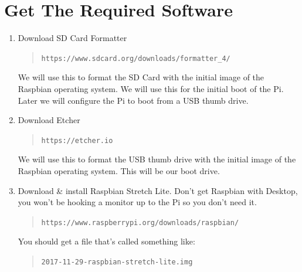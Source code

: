 \documentclass[11pt,oneside]{article}
\newcommand{\myurl}[1]{\begin{quote} \texttt{#1} \end{quote}}
\newcommand{\xtermPartialOutput}[1]{\begin{verse} \texttt{#1} \end{verse}}
\begin{document}
\section{Get The Required Software} \label{sect:getRequiredSoftware}
\begin{enumerate}
	\item Download SD Card Formatter
	\myurl{https://www.sdcard.org/downloads/formatter\_4/}
	We will use this to format the SD Card with the initial image of the Raspbian operating system.  We will use this for
	the initial boot of the Pi.  Later we will configure the Pi to boot from a USB thumb drive.
	\item Download Etcher
	\myurl{https://etcher.io}
	We will use this to format the USB thumb drive with the initial image of the Raspbian operating system.  This will be our boot drive.
	\item \label{itm:getRaspbian} Download \& install Raspbian Stretch Lite.  Don't get Raspbian with Desktop,
	you won't be hooking a monitor up to the Pi so you don't need it.
	\myurl{https://www.raspberrypi.org/downloads/raspbian/}
	You should get a file that's called something like: \xtermPartialOutput{2017-11-29-raspbian-stretch-lite.img}
\end{enumerate}
\end{document}
